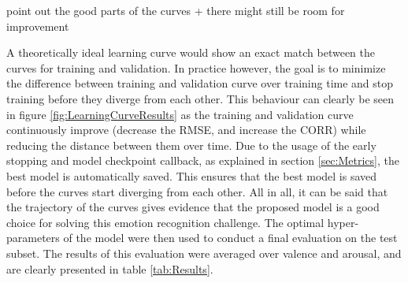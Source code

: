 
point out the good parts of the curves + there might still be room for improvement


A theoretically ideal learning curve would show an exact match between the curves for training and validation. In practice however, the goal is to minimize the difference between training and validation curve over training time and stop training before they diverge from each other. 
\newline\newline
This behaviour can clearly be seen in figure \ref{fig:LearningCurveResults} as the training and validation curve continuously improve (decrease the RMSE, and increase the CORR) while reducing the distance between them over time. Due to the usage of the early stopping and model checkpoint callback, as explained in section \ref{sec:Metrics}, the best model is automatically saved. This ensures that the best model is saved before the curves start diverging from each other.
\newline\newline
All in all, it can be said that the trajectory of the curves gives evidence that the proposed model is a good choice for solving this emotion recognition challenge. The optimal hyper-parameters of the model were then used to conduct a final evaluation on the test subset. The results of this evaluation were averaged over valence and arousal, and are clearly presented in table \ref{tab:Results}.

